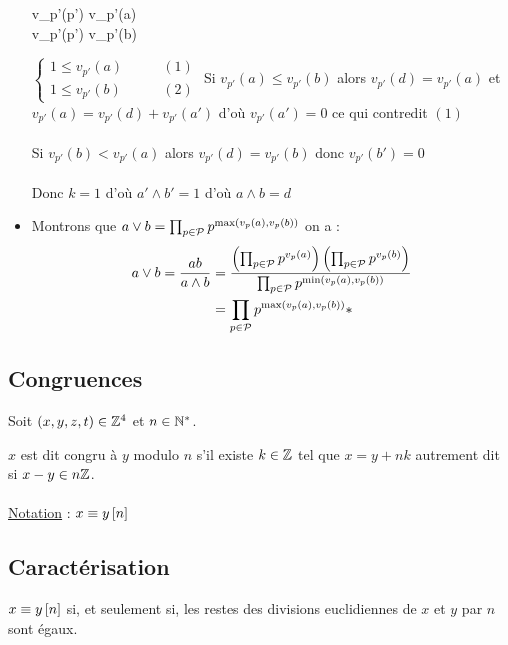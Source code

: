 \begin{dem}
\begin{itemize}
\begin{cases}
			      v_{p'}(p') \leq v_{p'}(a) \\
			      v_{p'}(p') \leq v_{p'}(b)
		      \end{cases}\) \ie \(\begin{cases}
			      1\leq v_{p'}(a)  & \qquad (1) \\
			      1 \leq v_{p'}(b) & \qquad (2)
		      \end{cases}\)
		      Si \(v_{p'}(a) \leq v_{p'}(b)\) alors \(v_{p'}(d) = v_{p'}(a)\) et \(v_{p'}(a) = v_{p'}(d) + v_{p'}(a')\) d'où \(v_{p'}(a') = 0\) ce qui contredit \((1)\)\\~\\
		      Si \(v_{p'}(b) < v_{p'}(a)\) alors \(v_{p'}(d) = v_{p'}(b)\) donc \(v_{p'}(b') = 0\)\\~\\
		      Donc \(k=1\) d'où \(a'\wedge b' = 1\) d'où \(a \wedge b = d\)
		\item Montrons que \(a\vee b = \prod_{p \in \mathcal{P}}p^{\max\left(v_p(a),v_p(b)\right)}\)
		      on a :\begin{align*}
			      a \vee b = \frac{ab}{a\wedge b} & = \frac{\left(\prod_{p \in \mathcal{P}} p ^{v_p(a)}\right)\left(\prod_{p \in \mathcal{P}} p ^{v_p(b)}\right)}{\prod_{ p \in \mathcal{P}} p^{\min\left(v_p(a),v_p(b)\right)}} \\
			                                      & = \prod_{p \in \mathcal{P}}p^{\max\left(v_p(a),v_p(b)\right)}*
		      \end{align*}
	\end{itemize}
\end{dem}

\subsection{Congruences}
Soit \((x, y, z, t) \in \mathbb{Z}^4\) et \(n \in \mathbb{N}^*\).

\begin{defi}
	\(x\) est dit congru à \(y\) modulo \(n\) s’il existe \(k \in \mathbb{Z}\) tel que \(x = y + nk\) autrement dit si \(x - y \in n\mathbb{Z}\).\\~\\
	\underline{Notation} : \( x \equiv y \left[n\right]\)
\end{defi}

\subsection{Caractérisation}
\begin{defprop}
	\(x \equiv y \left[n\right]\) si, et seulement si, les restes des divisions euclidiennes de \(x\) et \(y\) par \(n\) sont égaux.
\end{defprop}

